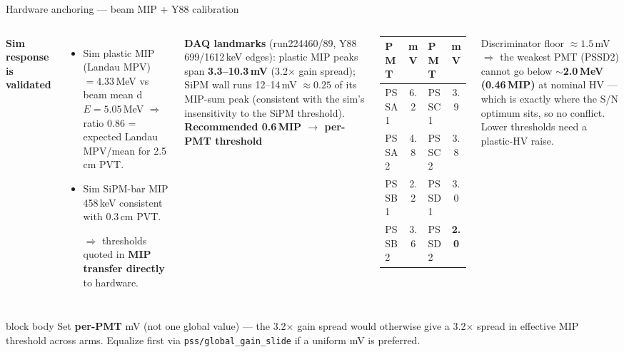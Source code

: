\documentclass[aspectratio=169,10pt]{beamer}
\newcommand{\keybox}[1]{\begin{beamercolorbox}[wd=\textwidth,sep=4pt,rounded=true]{block body}%
  \color{mxnavy}\small #1\end{beamercolorbox}}
\begin{document}
\begin{frame}{Hardware anchoring --- beam MIP + Y88 calibration}
\begin{columns}[T]
\textbf{Sim response is validated}
\begin{itemize}\small
\item Sim plastic MIP (Landau MPV) $=4.33$\,MeV vs beam mean d$E=5.05$\,MeV
      $\Rightarrow$ ratio 0.86 = expected Landau MPV/mean for 2.5\,cm PVT.
\item Sim SiPM-bar MIP 458\,keV consistent with 0.3\,cm PVT.
\item[$\Rightarrow$] thresholds quoted in \textbf{MIP transfer directly} to
      hardware.
\end{itemize}
\smallskip
\textbf{DAQ landmarks} (run224460/89, Y88 699/1612\,keV edges):
plastic MIP peaks span \textbf{3.3--10.3\,mV} (3.2$\times$ gain spread);
SiPM wall runs 12--14\,mV $\approx0.25$ of its MIP-sum peak (consistent with
the sim's insensitivity to the SiPM threshold).
\textbf{Recommended 0.6\,MIP $\to$ per-PMT threshold}
\smallskip

{\centering\scriptsize
\begin{tabular}{@{}lc|lc@{}}
\toprule
PMT & mV & PMT & mV\\
\midrule
PSSA1 & 6.2 & PSSC1 & 3.9\\
PSSA2 & 4.8 & PSSC2 & 3.8\\
PSSB1 & 2.2 & PSSD1 & 3.0\\
PSSB2 & 3.6 & PSSD2 & \textbf{2.0}\\
\bottomrule
\end{tabular}\par}
\smallskip\small
Discriminator floor $\approx1.5$\,mV $\Rightarrow$ the weakest PMT (PSSD2)
cannot go below \textbf{$\sim$2.0\,MeV (0.46\,MIP)} at nominal HV --- which is
exactly where the S/N optimum sits, so no conflict. Lower thresholds need a
plastic-HV raise.
\end{columns}
\vfill
\keybox{Set \textbf{per-PMT} mV (not one global value) --- the 3.2$\times$ gain
spread would otherwise give a 3.2$\times$ spread in effective MIP threshold
across arms. Equalize first via \texttt{pss/global\_gain\_slide} if a uniform
mV is preferred.}
\end{frame}
\end{document}
